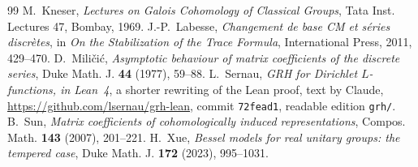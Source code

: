 \documentclass[reqno]{amsart}
\theoremstyle{definition}
\begin{document}
{\begin{thebibliography}{99}
 M.~Kneser, \emph{Lectures on Galois Cohomology of Classical Groups}, Tata Inst. Lectures 47, Bombay, 1969.
 J.-P.~Labesse, \emph{Changement de base CM et s\'eries discr\`etes}, in \emph{On the Stabilization of the Trace Formula}, International Press, 2011, 429--470.
 D.~Mili\v{c}i\'c, \emph{Asymptotic behaviour of matrix coefficients of the discrete series}, Duke Math. J. \textbf{44} (1977), 59--88.
 L.~Sernau, \emph{GRH for Dirichlet \(L\)-functions, in Lean~4}, a shorter rewriting of the Lean proof, text by Claude, \url{https://github.com/lsernau/grh-lean}, commit \texttt{72fead1}, readable edition \texttt{grh/}.
 B.~Sun, \emph{Matrix coefficients of cohomologically induced representations}, Compos. Math. \textbf{143} (2007), 201--221.
 H.~Xue, \emph{Bessel models for real unitary groups: the tempered case}, Duke Math. J. \textbf{172} (2023), 995--1031.
\end{thebibliography}
}
\end{document}
